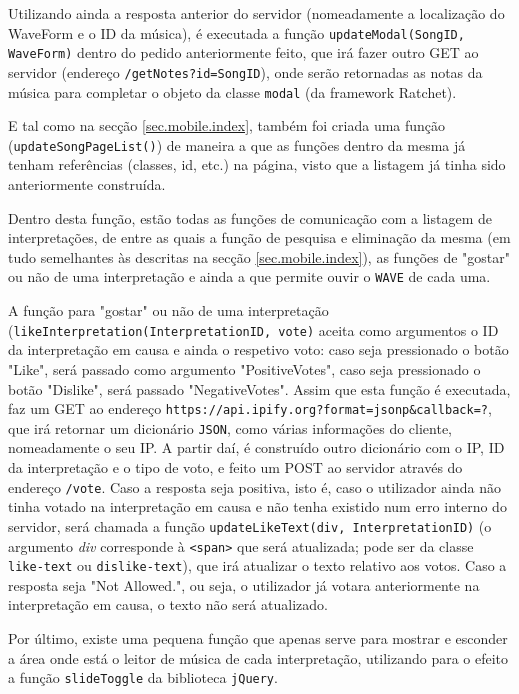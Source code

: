 \documentclass[a4paper,11pt,openright,oneside]{report}
\begin{document}
Utilizando ainda a resposta anterior do servidor (nomeadamente a localização do WaveForm e o ID da música), é executada a função \texttt{updateModal(SongID, WaveForm)} dentro do pedido anteriormente feito, que irá fazer outro GET ao servidor (endereço \texttt{/getNotes?id=SongID}), onde serão retornadas as notas da música para completar o objeto da classe \texttt{modal} (da framework Ratchet).

E tal como na secção \autoref{sec.mobile.index}, também foi criada uma função (\texttt{updateSongPageList()}) de maneira a que as funções dentro da mesma já tenham referências (classes, id, etc.) na página, visto que a listagem já tinha sido anteriormente construída.

Dentro desta função, estão todas as funções de comunicação com a listagem de interpretações, de entre as quais a função de pesquisa e eliminação da mesma (em tudo semelhantes às descritas na secção \autoref{sec.mobile.index}), as funções de "gostar" ou não de uma interpretação e ainda a que permite ouvir o \verb|WAVE| de cada uma.

A função para "gostar" ou não de uma interpretação (\texttt{likeInterpretation}\texttt{(InterpretationID, vote)} aceita como argumentos o ID da interpretação em causa e ainda o respetivo voto: caso seja pressionado o botão "Like", será passado como argumento "PositiveVotes", caso seja pressionado o botão "Dislike", será passado "NegativeVotes". Assim que esta função é executada, faz um GET ao endereço \texttt{https://api.ipify.org?format=jsonp\&callback=?}, que irá retornar um dicionário \verb|JSON|, como várias informações do cliente, nomeadamente o seu IP. A partir daí, é construído outro dicionário com o IP, ID da interpretação e o tipo de voto, e feito um POST ao servidor através do endereço \texttt{/vote}. Caso a resposta seja positiva, isto é, caso o utilizador ainda não tinha votado na interpretação em causa e não tenha existido num erro interno do servidor, será chamada a função \texttt{updateLikeText(div, InterpretationID)} (o argumento \textit{div} corresponde à \texttt{<span>} que será atualizada; pode ser da classe \texttt{like-text} ou \texttt{dislike-text}), que irá atualizar o texto relativo aos votos. Caso a resposta seja "Not Allowed.", ou seja, o utilizador já votara anteriormente na interpretação em causa, o texto não será atualizado.

Por último, existe uma pequena função que apenas serve para mostrar e esconder a área onde está o leitor de música de cada interpretação, utilizando para o efeito a função \texttt{slideToggle} da biblioteca \verb|jQuery|.
\end{document}
